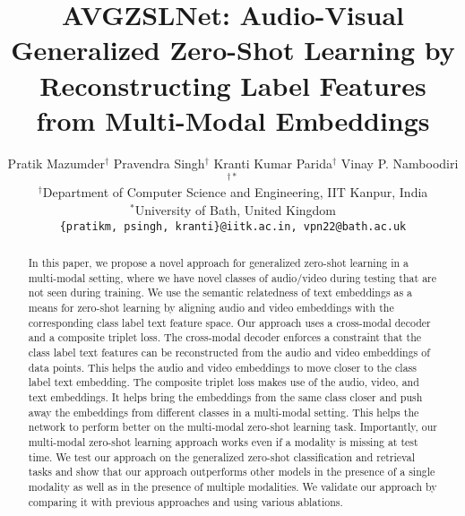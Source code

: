 \documentclass[10pt,twocolumn,letterpaper]{article}
\begin{document}
\title{AVGZSLNet: Audio-Visual Generalized Zero-Shot Learning by Reconstructing Label Features from Multi-Modal Embeddings}



\author{
Pratik Mazumder$^{\dagger}$ \hspace{1cm}Pravendra Singh$^{\dagger}$ \hspace{1cm}Kranti Kumar Parida$^{\dagger}$ \hspace{1cm}Vinay P. Namboodiri$^{\dagger \ast}$\\
$^{\dagger}$Department of Computer Science and Engineering, IIT Kanpur, India\\
$^{\ast}$University of Bath, United Kingdom \\
{\tt\small \{pratikm, psingh, kranti\}@iitk.ac.in, vpn22@bath.ac.uk}
}

\maketitle


\begin{abstract}
In this paper, we propose a novel approach for generalized zero-shot learning in a multi-modal setting, where we have novel classes of audio/video during testing that are not seen during training. We use the semantic relatedness of text embeddings as a means for zero-shot learning by aligning audio and video embeddings with the corresponding class label text feature space. Our approach uses a cross-modal decoder and a composite triplet loss. The cross-modal decoder enforces a constraint that the class label text features can be reconstructed from the audio and video embeddings of data points. This helps the audio and video embeddings to move closer to the class label text embedding. The composite triplet loss makes use of the audio, video, and text embeddings. It helps bring the embeddings from the same class closer and push away the embeddings from different classes in a multi-modal setting. This helps the network to perform better on the multi-modal zero-shot learning task. Importantly, our multi-modal zero-shot learning approach works even if a modality is missing at test time.  We test our approach on the generalized zero-shot classification and retrieval tasks and show that our approach outperforms other models in the presence of a single modality as well as in the presence of multiple modalities. We validate our approach by comparing it with previous approaches and using various ablations.

\end{abstract}
\end{document}
